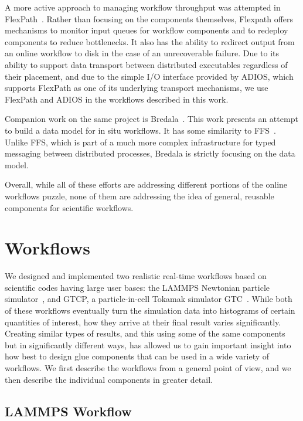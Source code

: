 \documentclass[conference]{IEEEtran}
\begin{document}
A more active approach to managing workflow throughput was attempted in
FlexPath~\cite{Dayal:2014:flexpath}. Rather than focusing on the components
themselves, Flexpath offers mechanisms to monitor input queues for workflow
components and to redeploy components to reduce bottlenecks. It also has the
ability to redirect output from an online workflow to disk in the case of an
unrecoverable failure. Due to its ability to support data transport between
distributed executables regardless of their placement, and due to the simple I/O
interface provided by ADIOS, which supports FlexPath as one of its underlying
transport mechanisms, we use FlexPath and ADIOS in the workflows described
in this work.

Companion work on the same project is Bredala~\cite{dreher:2016:bredala}. This
work presents an attempt to build a data model for in situ workflows. It has
some similarity to FFS~\cite{eisenhauer:2011:ffs}. Unlike FFS, which is part
of a much more complex infrastructure for typed messaging between distributed
processes, Bredala is strictly focusing on the data model.

Overall, while all of these efforts are addressing different portions of the
online workflows puzzle, none of them are addressing the idea of general,
reusable components for scientific workflows.

\section{Workflows}
\label{s:workflow}

We designed and implemented two realistic real-time workflows based on
scientific codes having large user bases: the LAMMPS Newtonian particle
simulator~\cite{plimpton:1997:lammps}, and GTCP, a particle-in-cell
Tokamak simulator GTC~\cite{lin:gtc}. While both of these
workflows eventually turn the simulation data into histograms of certain
quantities of interest, how they arrive at their final result varies
significantly. Creating similar types of results, and this using some of the
same components but in significantly different ways, has allowed us to gain
important insight into how best to design glue components that can be used in a wide
variety of workflows. We first describe the workflows from a general point of
view, and we then describe the individual components in greater detail.

\subsection{LAMMPS Workflow}
\end{document}
